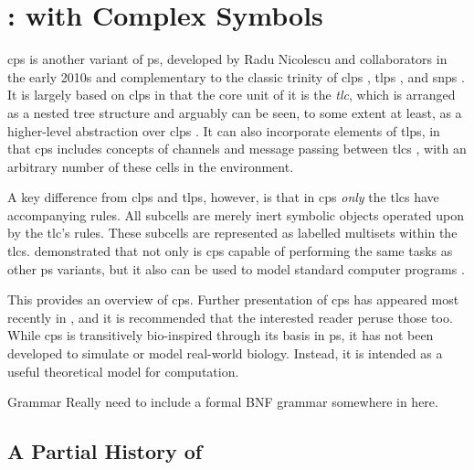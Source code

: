 \chapter{\label{chap:cpsystems}:  with Complex Symbols}

\gls{cps} is another variant of \gls{ps}, developed by Radu Nicolescu and collaborators in the early 2010s and complementary to the classic trinity of \gls{clps} \cite{Paun2000}, \gls{tlps} \cite{Martin-Vide2003}, and \gls{snps} \cite{Ionescu2006}.  It is largely based on \gls{clps} in that the core unit of it is the \emph{\gls{tlc}}, which is arranged as a nested tree structure and arguably can be seen, to some extent at least, as a higher-level abstraction over \gls{clps} \cite{Nicolescu2018}.  It can also incorporate elements of \gls{tlps}, in that \gls{cps} includes concepts of channels and message passing between \glspl{tlc} \cite{Henderson2019}, with an arbitrary number of these cells in the environment.  

A key difference from \gls{clps} and \gls{tlps}, however, is that in \gls{cps} \emph{only} the \glspl{tlc} have accompanying rules.  All subcells are merely inert symbolic objects operated upon by the \gls{tlc}'s rules.  These subcells are represented as labelled multisets within the \glspl{tlc}.  \citeauthor{Nicolescu2014a} demonstrated that not only is \gls{cps} capable of performing the same tasks as other \gls{ps} variants, but it also can be used to model standard computer programs \cite{Nicolescu2014a}.


This  provides an overview of \gls{cps}.  Further presentation of \gls{cps} has appeared most recently in \cite{Nicolescu2018,Henderson2019,Henderson2020,Liu2020,Liu2021}, and it is recommended that the interested reader peruse those too.  While \gls{cps} is transitively bio-inspired through its basis in \gls{ps}, it has not been developed to simulate or model real-world biology.  Instead, it is intended as a useful theoretical model for computation.

\begin{anfxwarning}{Grammar}
Really need to include a formal BNF grammar somewhere in here.
\end{anfxwarning}

\section{A Partial History of }

